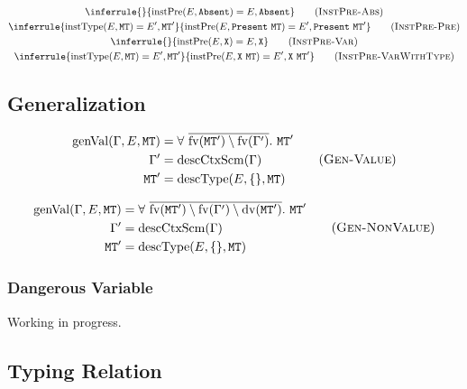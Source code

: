 \documentclass{report}
\newcommand{\code}{\mathtt}
\newcommand{\ruleTag}[1]{\label{#1}\tag{\textsc{#1}}}
\DeclareMathOperator{\describeContextScheme}{descCtxScm}
\DeclareMathOperator{\describeType}{descType}
\DeclareMathOperator{\instantiateType}{instType}
\DeclareMathOperator{\instantiatePresence}{instPre}
\DeclareMathOperator{\generalizeValue}{genVal}
\DeclareMathOperator{\freeVariable}{fv}
\DeclareMathOperator{\dangerousVariable}{dv}
\begin{document}
\begin{gather}
\inferrule
{}
{\instantiatePresence(E, \code{Absent}) = E, \code{Absent}}
\ruleTag{InstPre-Abs}
\\
\inferrule
{\instantiateType(E, \code{MT}) = E', \code{MT}'}
{\instantiatePresence(E, \code{Present}\ \code{MT}) = E', \code{Present}\ \code{MT}'}
\ruleTag{InstPre-Pre}
\\
\inferrule
{}
{\instantiatePresence(E, \code{X}) = E, \code{X}}
\ruleTag{InstPre-Var}
\\
\inferrule
{\instantiateType(E, \code{MT}) = E', \code{MT}'}
{\instantiatePresence(E, \code{X}\ \code{MT}) = E', \code{X}\ \code{MT}'}
\ruleTag{InstPre-VarWithType}
\end{gather}

\subsection{Generalization}

\begin{equation}
\begin{split}
\generalizeValue(\Gamma, E, \code{MT}) & = \forall\ \overline{\freeVariable(\code{MT}') \setminus \freeVariable(\Gamma')}.\ \code{MT}' \\
\Gamma' & = \describeContextScheme(\Gamma) \\
\code{MT}' & = \describeType(E, \{\}, \code{MT})
\end{split}
\ruleTag{Gen-Value}
\end{equation}

\begin{equation}
\begin{split}
\generalizeValue(\Gamma, E, \code{MT}) & = \forall\ \overline{\freeVariable(\code{MT}') \setminus \freeVariable(\Gamma') \setminus \dangerousVariable(\code{MT}')}.\ \code{MT}' \\
\Gamma' & = \describeContextScheme(\Gamma) \\
\code{MT}' & = \describeType(E, \{\}, \code{MT})
\end{split}
\ruleTag{Gen-NonValue}
\end{equation}

\subsubsection{Dangerous Variable}

Working in progress.

\subsection{Typing Relation}
\end{document}
